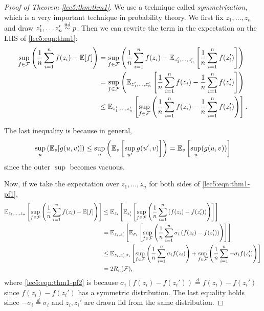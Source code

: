 \begin{proof}[Proof of Theorem \ref{lec5:thm:thm1}]
We use a technique called \textit{symmetrization}, which is a very important technique in probability theory. We first fix $z_1, \dots, z_n$and draw $ z_1', \dots z_n' \overset{\textup{iid}}{\sim} p$. Then we can rewrite the term in the expectation on the LHS of \eqref{lec5:eqn:thm1}:
\begin{align}
    \sup_{f \in \mathcal F} \left( \frac{1}{n} \sum^n_{i=1} f(z_i) - \mathbb E[f] \right) &= \sup_{f \in \mathcal F} \left( \frac{1}{n} \sum^n_{i=1} f(z_i) - \mathbb E_{z_1',\dots, z_n'} \left[ \frac{1}{n} \sum^n_{i=1} f(z_i')\right] \right) \\
    &= \sup_{f \in \mathcal F} \left( \mathbb E_{z_1',\dots, z_n'} \left[\frac{1}{n} \sum^n_{i=1} f(z_i) -  \frac{1}{n} \sum^n_{i=1} f(z_i')\right] \right)\\
    &\leq \mathbb E_{z_1',\dots, z_n'} \left[\sup_{f \in \mathcal F} \left( \frac{1}{n} \sum^n_{i=1} f(z_i) -  \frac{1}{n} \sum^n_{i=1} f(z_i')\right)\right]. \label{lec5:eqn:thm1-pf1}
\end{align}

The last inequality is because in general,
\begin{align}
    \sup_u \left(\mathbb E_v[g(u,v)]\right) \leq \sup_u \left( \mathbb E_v\left[\sup_{u'}g(u',v)\right]\right) = \mathbb E_v \left[\sup_u (g(u,v))\right]
\end{align}
since the outer $\sup$ becomes vacuous.

Now, if we take the expectation over $z_1, \dots, z_n$ for both sides of \eqref{lec5:eqn:thm1-pf1},
\begin{align}
    \mathbb E_{z_1, \dots, z_n} \left[\sup_{f \in \mathcal F} \left( \frac{1}{n} \sum^n_{i=1} f(z_i) - \mathbb E[f] \right) \right] 
    &\leq \mathbb E_{z_i} \left[ \mathbb E_{z_i'} \left[\sup_{f \in \mathcal F} \left( \frac{1}{n} \sum^n_{i=1} \left(f(z_i) -  f(z_i')\right)\right)\right]\right]\\
    &= \mathbb E_{z_i,z_i'} \left[ \mathbb E_{\sigma_i} \left[\sup_{f \in \mathcal F} \left( \frac{1}{n} \sum^n_{i=1} \sigma_i\left(f(z_i) -  f(z_i')\right)\right)\right]\right] \label{lec5:eqn:thm1-pf2} \\
 &\leq \mathbb E_{z_i,z_i', \sigma_i} \left[\sup_{f \in \mathcal F} \left( \frac{1}{n} \sum^n_{i=1} \sigma_i f(z_i)\right)+\sup_{f \in \mathcal F} \left( \frac{1}{n} \sum^n_{i=1} -\sigma_i f(z_i')\right)\right] \\
    &= 2R_n(\mathcal F),
\end{align}
where \eqref{lec5:eqn:thm1-pf2} is because $\sigma_i(f(z_i) - f(z_i')) \stackrel{d}{=} f(z_i) - f(z_i')$ since $f(z_i) - f(z_i')$ has a symmetric distribution. The last equality holds since $-\sigma_i \overset{d}{=} \sigma_i$ and $z_i, z_i'$ are drawn iid from the same distribution. 
\end{proof}

